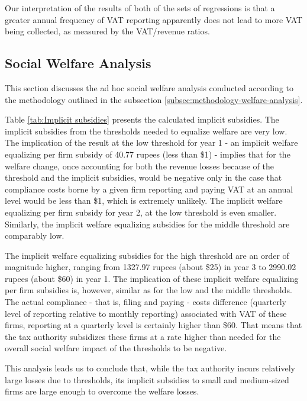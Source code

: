 Our interpretation of the results of both of the sets of regressions
is that a greater annual frequency of VAT reporting apparently does
not lead to more VAT being collected, as measured by the VAT/revenue
ratios.

\subsection{Social Welfare Analysis}
\label{subsec:3-results-social-welfare}

This section discusses the ad hoc social welfare analysis conducted according to the methodology outlined in the subsection \cref{subsec:methodology-welfare-analysis}. 

Table \ref{tab:Implicit subsidies} presents the calculated implicit subsidies. The implicit subsidies from the thresholds needed to equalize welfare are very low. The implication of the result at the low threshold for year 1 - an implicit welfare equalizing per firm subsidy of 40.77 rupees (less than \$1) - implies that for the welfare change, once accounting for both the revenue losses because of the threshold and the implicit subsidies, would be negative only in the case that compliance costs borne by a given firm reporting and paying VAT at an annual level would be less than \$1, which is extremely unlikely. The implicit welfare equalizing per firm subsidy for year 2, at the low threshold is even smaller. Similarly, the implicit welfare equalizing subsidies for the middle threshold are comparably low. 

The implicit welfare equalizing subsidies for the high threshold are an order of magnitude higher, ranging from 1327.97 rupees (about \$25) in year 3 to 2990.02 rupees (about \$60) in year 1. The implication of these implicit welfare equalizing per firm subsidies is, however, similar as for the low and the middle thresholds. The actual compliance - that is, filing and paying - costs difference (quarterly level of reporting relative to monthly reporting) associated with VAT of these firms, reporting at a quarterly level is certainly higher than \$60. That means that the tax authority subsidizes these firms at a rate higher than needed for the overall social welfare impact of the thresholds to be negative. 

This analysis leads us to conclude that, while the tax authority incurs relatively large losses due to thresholds, its implicit subsidies to small and medium-sized firms are large enough to overcome the welfare losses.


